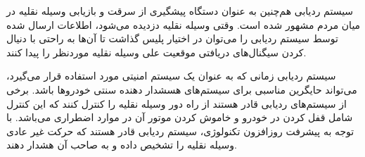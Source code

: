  
 سیستم ردیابی هم‌چنین به عنوان دستگاه پیشگیری از سرقت و بازیابی وسیله نقلیه در میان مردم مشهور شده است. وقتی وسیله نقلیه دزدیده می‌شود، اطلاعات ارسال شده توسط سیستم ردیابی را می‌توان در اختیار پلیس گذاشت تا آن‌ها به راحتی با دنیال کردن سیگنال‌های دریافتی موقعیت علی وسیله نقلیه موردنظر را پیدا کنند.
 
 
 سیستم ردیابی زمانی که به عنوان یک سیستم امنیتی مورد استفاده قرار می‌گیرد، می‌تواند حایگرین مناسبی برای سیستم‌های هسشدار دهنده سنتی خودروها باشد. برخی از سیستم‌های ردیابی قادر هستند از راه دور وسیله نقلیه را کنترل کنند که این کنترل شامل قفل کردن در خودرو و خاموش کردن موتور آن در موارد اضطراری می‌باشد. با توجه به پیشرفت روزافزون تکنولوژی، سیستم ردیابی قادر هستند که حرکت غیر عادی وسیله نقلیه را تشخیص داده و به صاحب آن هشدار دهند.
 
  



